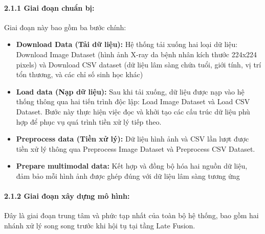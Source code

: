    
    \paragraph{2.1.1 Giai đoạn chuẩn bị:} Giai đoạn này bao gồm ba bước chính:
    
    \begin{itemize}
    \item \textbf{Download Data (Tải dữ liệu): } Hệ thống tải xuống hai loại dữ liệu: Download Image Dataset (hình ảnh X-ray da bệnh nhân kích thước 224x224 pixels) và Download CSV dataset (dữ liệu lâm sàng chứa tuổi, giới tính, vị trí tổn thương, và các chỉ số sinh học khác)
    
    \item \textbf{Load data (Nạp dữ liệu): } Sau khi tải xuống, dữ liệu được nạp vào hệ thống thông qua hai tiến trình độc lập: Load Image Dataset và Load CSV Dataset. Bước này thực hiện việc đọc và khởi tạo các cấu trúc dữ liệu phù hợp để phục vụ quá trình tiền xử lý tiếp theo.

    \item \textbf{Preprocess data (Tiền xử lý): } Dữ liệu hình ảnh và CSV lần lượt được tiền xử lý thông qua Preprocess Image Dataset và Preprocess CSV Dataset. 

    \item \textbf{Prepare multimodal data: } Kết hợp và đồng bộ hóa hai nguồn dữ liệu, đảm bảo mỗi hình ảnh được ghép đúng với dữ liệu lâm sàng tương ứng

\end{itemize}

    \paragraph{2.1.2 Giai đoạn xây dựng mô hình:}
    Đây là giai đoạn trung tâm và phức tạp nhất của toàn bộ hệ thống, bao gồm hai nhánh xử lý song song trước khi hội tụ tại tầng Late Fusion.

